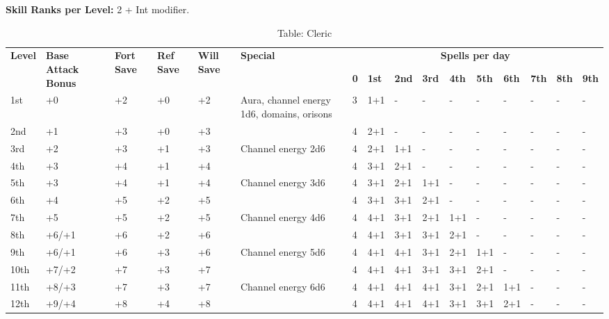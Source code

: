 \textbf{Skill Ranks per Level: }2 + Int modifier.

\begin{table*}[]
\caption{Table: Cleric}
\sffamily
\setlength{\tabcolsep}{1pt}
\begin{tabularx}{\linewidth}{lp{6em}p{2.5em}p{2.5em}p{2.5em}Xllllllllll}
\multirow{2}{*}{\textbf{Level}} & \multirow{2}{*}{\parbox{5em}{\textbf{Base Attack Bonus}}} & \multirow{2}{*}{\parbox{1.5em}{\textbf{Fort Save}}} & \multirow{2}{*}{\parbox{1.5em}{\textbf{Ref Save}}} & \multirow{2}{*}{\parbox{1.5em}{\textbf{Will Save}}} & \textbf{Special} & \multicolumn{10}{c}{\textbf{Spells per day}} \\
                       &                                    &                            &                           &                            &                                                                                                  &  \textbf{0} & \textbf{1st} & \textbf{2nd} & \textbf{3rd} & \textbf{4th} & \textbf{5th} & \textbf{6th} & \textbf{7th} & \textbf{8th} & \textbf{9th} \\
1st & +0 & +2 & +0 & +2 & Aura, channel energy 1d6, domains, orisons & 3 & 1+1 & - & - & - & - & - & - & - & -\\
2nd & +1 & +3 & +0 & +3 &  & 4 & 2+1 & - & - & - & - & - & - & - & -\\
3rd & +2 & +3 & +1 & +3 & Channel energy 2d6 & 4 & 2+1 & 1+1 & - & - & - & - & - & - & -\\
4th & +3 & +4 & +1 & +4 &  & 4 & 3+1 & 2+1 & - & - & - & - & - & - & -\\
5th & +3 & +4 & +1 & +4 & Channel energy 3d6 & 4 & 3+1 & 2+1 & 1+1 & - & - & - & - & - & -\\
6th & +4 & +5 & +2 & +5 &  & 4 & 3+1 & 3+1 & 2+1 & - & - & - & - & - & -\\
7th & +5 & +5 & +2 & +5 & Channel energy 4d6 & 4 & 4+1 & 3+1 & 2+1 & 1+1 & - & - & - & - & -\\
8th & +6/+1 & +6 & +2 & +6 &  & 4 & 4+1 & 3+1 & 3+1 & 2+1 & - & - & - & - & -\\
9th & +6/+1 & +6 & +3 & +6 & Channel energy 5d6 & 4 & 4+1 & 4+1 & 3+1 & 2+1 & 1+1 & - & - & - & -\\
10th & +7/+2 & +7 & +3 & +7 &  & 4 & 4+1 & 4+1 & 3+1 & 3+1 & 2+1 & - & - & - & -\\
11th & +8/+3 & +7 & +3 & +7 & Channel energy 6d6 & 4 & 4+1 & 4+1 & 4+1 & 3+1 & 2+1 & 1+1 & - & - & -\\
12th & +9/+4 & +8 & +4 & +8 &  & 4 & 4+1 & 4+1 & 4+1 & 3+1 & 3+1 & 2+1 & - & - & -\\

\end{tabularx}
\end{table*}
